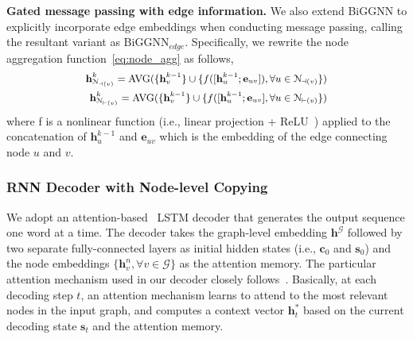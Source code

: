 \documentclass[journal]{IEEEtran}
\let\vec\mathbf
\begin{document}
\smallskip
\noindent\textbf{Gated message passing with edge information.}
We also extend BiGGNN to explicitly incorporate edge embeddings when conducting message passing, calling the resultant variant as BiGGNN$_{edge}$.
Specifically, we rewrite the node aggregation function~\cref{eq:node_agg}
as follows,
\begin{equation}\label{eq:node_edge_agg}
\small
\begin{aligned}
\vec{h}^k_{\EuScript{N}_{\dashv(v)}}=\text{AVG}(\{\vec{h}^{k-1}_v\} \cup \{f([\vec{h}^{k-1}_u; \vec{e}_{uv}]), \forall u \in \EuScript{N}_{\dashv(v)}\})\\
\vec{h}^k_{\EuScript{N}_{\vdash(v)}}=\text{AVG}(\{\vec{h}^{k-1}_v\} \cup \{f([\vec{h}^{k-1}_u; \vec{e}_{uv}], \forall u \in \EuScript{N}_{\vdash(v)}\})
\end{aligned}
\end{equation}
where f is a nonlinear function (i.e., linear projection + ReLU~\cite{nair2010rectified}) applied to the concatenation of $\vec{h}^{k-1}_u$ and $\vec{e}_{uv}$ which is
the embedding of the edge connecting node $u$ and $v$.






\subsubsection{RNN Decoder with Node-level Copying}

We adopt an attention-based~\cite{bahdanau2014neural,luong2015effective} LSTM decoder that generates the output sequence one word at a time.
The decoder takes the graph-level embedding $\vec{h}^\mathcal{G}$ followed by two separate fully-connected layers as initial hidden states (i.e., $\vec{c}_0$ and $\vec{s}_0$) and the node embeddings $\{\vec{h}^{n}_v, \forall v \in \mathcal{G}\}$ as the attention memory.
The particular attention mechanism used in our decoder closely follows~\cite{see2017get}.
Basically, at each decoding step $t$, an attention mechanism learns to attend to the most relevant nodes in the input graph, and computes a context vector $\vec{h}^*_t$ based on the current decoding state $\vec{s}_t$ and the attention memory.
\end{document}
